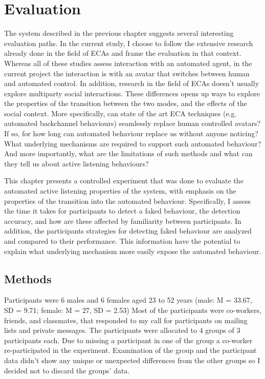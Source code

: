 \documentclass[]{simple-thesis}
\begin{document}
\chapter{Evaluation}\label{evaluation}

The system described in the previous chapter suggests several interesting evaluation paths.
In the current study, I choose to follow the extensive research already done in the field of ECAs \citep{Nishimura2007, Bevacqua2008, Gratch2007, Huang2011, Lee2006, Poppe2013} and frame the evaluation in that context.
Whereas all of these studies assess interaction with an automated agent, in the current project the interaction is with an avatar that switches between human and automated control.
In addition, research in the field of ECAs doesn't usually explore multiparty social interactions.
These differences opens up ways to explore the properties of the transition between the two modes, and the effects of the social context.
More specifically, can state of the art ECA techniques (e.g. automated backchannel behaviours) seamlessly replace human controlled avatars?
If so, for how long can automated behaviour replace us without anyone noticing?
What underlying mechanisms are required to support such automated behaviour?
And more importantly, what are the limitations of such methods and what can they tell us about active listening behaviours?

This chapter presents a controlled experiment that was done to evaluate the automated active listening properties of the system, with emphasis on the properties of the transition into the automated behaviour.
Specifically, I assess the time it takes for participants to detect a faked behaviour, the detection accuracy, and how are these affected by familiarity between participants.
In addition, the participants strategies for detecting faked behaviour are analyzed and compared to their performance.
This information have the potential to explain what underlying mechanism more easily expose the automated behaviour.

\section{Methods}

Participants were 6 males and 6 females aged 23 to 52 years (male: M = 33.67, SD = 9.71; female: M = 27, SD = 2.53)
Most of the participants were co-workers, friends, and classmates, that responded to my call for participants on mailing lists and private messages.
The participants were allocated to 4 groups of 3 participants each.
Due to missing a participant in one of the group a co-worker re-participated in the experiment.
Examination of the group and the participant data didn't show any unique or unexpected differences from the other groups so I decided not to discard the groups' data.
\end{document}
